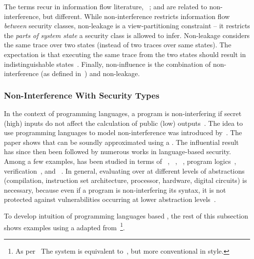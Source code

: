 The terms recur in information flow literature, \eg~\cite{nelson2020,ileri2024};
and are related to {non-interference}, but different.
While non-interference restricts information flow \emph{between} security classes,
{{non-leakage}} is a view-partitioning constraint --
it restricts the \emph{parts of system state} a security class is allowed to infer.
Non-leakage considers the same trace over two states (instead of two traces over same states).
The expectation is that executing the same trace from the two states should result in indistinguishable states~\cite{nelson2020}.
Finally, {{non-influence}} is the combination of non-interference (as defined in~\cite{rushby1992}) and non-leakage.

\subsubsection{Non-Interference With Security Types}
\label{sec-types}

In the context of programming languages, a program is
{non-interfering} if {secret (high) inputs} do not
affect the calculation of {public (low) outputs}~\cite{sabelfeld2003}. The idea
to use programming languages to model {non-interference}
was introduced by~\textcite{volpano1996}. The paper shows that
 can be soundly approximated using a
{}. The influential result has since then been
followed by numerous works in language-based security. Among a few examples,
 has been studied in terms of ~\cite{barthe2007,huang2014}, ~\cite{patrignani2017,myers1999,cecchetti2017}, ~\cite{kammuller2008,nelson2020}, program
logics~\cite{frumin2021,karbyshev2018,garg2006,beringer2007},
verification~\cite{eilers2023}, and ~\cite{hritcu2013}. In
general, evaluating  over at different levels of
abstractions (compilation, instruction set architecture, processor, hardware,
digital circuits) is necessary, because even if a program is
{non-interfering} \wrt its syntax, it is not protected
against vulnerabilities occurring at lower abstraction
levels~\cite{piessens2024}.

To develop intuition of programming languages based , the
rest of this subsection shows examples using {a }
adapted from~\textcite{sabelfeld2003}\footnote{As per~\cite[p. 9,
\S{}B]{sabelfeld2003} The system is equivalent to~\textcite{volpano1996}, but
more conventional in style.}.

